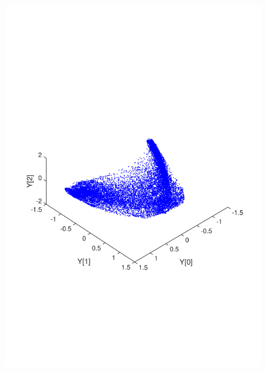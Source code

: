 \documentclass[11pt]{article} %
\begin{document}
\begin{figure}
{{\includegraphics*[trim={0cm 5cm 0cm 9cm},clip,width=0.7\linewidth,clip]{1-12maniWFlips.pdf}}}%
\caption{}
\label{fig:manifolds}
\end{figure}
\end{document}
